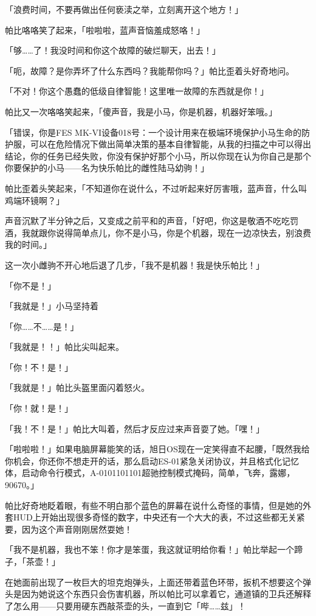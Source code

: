 「浪费时间，不要再做出任何亵渎之举，立刻离开这个地方！」

帕比咯咯笑了起来，「啦啦啦，蓝声音恼羞成怒咯！」

「够……了！我没时间和你这个故障的破烂聊天，出去！」

「呃，故障？是你弄坏了什么东西吗？我能帮你吗？」帕比歪着头好奇地问。

「不对！你这个愚蠢的低级自律智能！这里唯一故障的东西就是你！」

帕比又一次咯咯笑起来，「傻声音，我是小马，你是机器，机器好笨哦。」

「错误，你是FES MK-VI设备018号：一个设计用来在极端环境保护小马生命的防护服，可以在危险情况下做出简单决策的基本自律智能，从我的扫描之中可以得出结论，你的任务已经失败，你没有保护好那个小马，所以你现在认为你自己是那个你要保护的小马——名为快乐帕比的雌性陆马幼驹！」

帕比歪着头笑起来，「不知道你在说什么，不过听起来好厉害哦，蓝声音，什么叫鸡端环镜啊？」

声音沉默了半分钟之后，又变成之前平和的声音，「好吧，你这是敬酒不吃吃罚酒，我就跟你说得简单点儿，你不是小马，你是个机器，现在一边凉快去，别浪费我的时间。」

这一次小雌驹不开心地后退了几步，「我不是机器！我是快乐帕比！」

「你不是！」

「我就是！」小马坚持着

「你……不……是！」

「我就是！！」帕比尖叫起来。

「你！不！是！」

「我就是！」帕比头盔里面闪着怒火。

「你！就！是！」

「我！不！是！」帕比大叫着，然后才反应过来声音耍了她。「嘿！」

「啦啦啦！」如果电脑屏幕能笑的话，旭日OS现在一定笑得直不起腰，「既然我给你机会，你还你不想走开的话，那么启动ES-01紧急关闭协议，并且格式化记忆体，启动命令行模式，A-0101101101超驰控制模式掩码，简单，飞奔，露娜，90670。」

帕比好奇地眨着眼，有些不明白那个蓝色的屏幕在说什么奇怪的事情，但是她的外套HUD上开始出现很多奇怪的数字，中央还有一个大大的表，不过这些都无关紧要，因为这个声音刚刚居然耍她！

「我不是机器，我也不笨！你才是笨蛋，我这就证明给你看！」帕比举起一个蹄子，「茶壶！」

在她面前出现了一枚巨大的坦克炮弹头，上面还带着蓝色环带，扳机不想要这个弹头是因为她说这个东西只会伤害机器，所以帕比可以拿着它，通道镇的卫兵还解释了怎么用——只要用硬东西敲茶壶的头，一直到它「哔……兹」！


